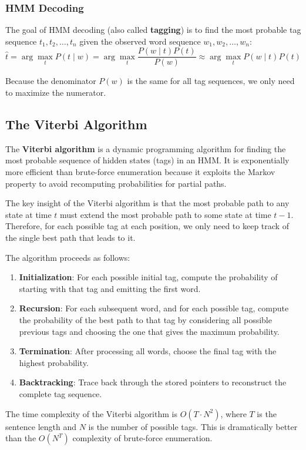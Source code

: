 \documentclass[11pt,a4paper]{article}
\begin{document}
\subsubsection{HMM Decoding}

The goal of HMM decoding (also called \textbf{tagging}) is to find the most probable tag sequence $t_1, t_2, \ldots, t_n$ given the observed word sequence $w_1, w_2, \ldots, w_n$:
\[
\hat{t} = \arg\max_t P(t \mid w) = \arg\max_t \frac{P(w \mid t) P(t)}{P(w)} \approx \arg\max_t P(w \mid t) P(t)
\]

Because the denominator $P(w)$ is the same for all tag sequences, we only need to maximize the numerator.

\subsection{The Viterbi Algorithm}

The \textbf{Viterbi algorithm} is a dynamic programming algorithm for finding the most probable sequence of hidden states (tags) in an HMM. It is exponentially more efficient than brute-force enumeration because it exploits the Markov property to avoid recomputing probabilities for partial paths.

The key insight of the Viterbi algorithm is that the most probable path to any state at time $t$ must extend the most probable path to some state at time $t-1$. Therefore, for each possible tag at each position, we only need to keep track of the single best path that leads to it.

The algorithm proceeds as follows:
\begin{enumerate}
    \item \textbf{Initialization}: For each possible initial tag, compute the probability of starting with that tag and emitting the first word.
    \item \textbf{Recursion}: For each subsequent word, and for each possible tag, compute the probability of the best path to that tag by considering all possible previous tags and choosing the one that gives the maximum probability.
    \item \textbf{Termination}: After processing all words, choose the final tag with the highest probability.
    \item \textbf{Backtracking}: Trace back through the stored pointers to reconstruct the complete tag sequence.
\end{enumerate}

The time complexity of the Viterbi algorithm is $O(T \cdot N^2)$, where $T$ is the sentence length and $N$ is the number of possible tags. This is dramatically better than the $O(N^T)$ complexity of brute-force enumeration.
\end{document}
